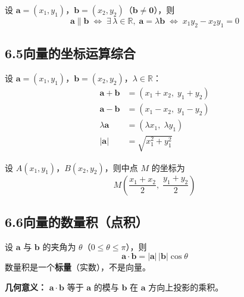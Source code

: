 \documentclass[12pt, a4paper]{ctexart}
\begin{document}
\begin{knowledgebox}[共线（平行）的充要条件]
设 $\boldsymbol{a}=(x_1,y_1)$，$\boldsymbol{b}=(x_2,y_2)$（$\boldsymbol{b}\neq\boldsymbol{0}$），则
\[
\boldsymbol{a}\parallel\boldsymbol{b} \;\Longleftrightarrow\; \exists\,\lambda\in\mathbb{R},\;\boldsymbol{a}=\lambda\boldsymbol{b}
\;\Longleftrightarrow\; x_1 y_2 - x_2 y_1 = 0
\]
\end{knowledgebox}

\subsection*{6.5\quad 向量的坐标运算综合}

\begin{knowledgebox}[坐标运算汇总]
设 $\boldsymbol{a}=(x_1,y_1)$，$\boldsymbol{b}=(x_2,y_2)$，$\lambda\in\mathbb{R}$：
\[
\begin{aligned}
  \boldsymbol{a}+\boldsymbol{b} &= (x_1+x_2,\; y_1+y_2) \\
  \boldsymbol{a}-\boldsymbol{b} &= (x_1-x_2,\; y_1-y_2) \\
  \lambda\boldsymbol{a} &= (\lambda x_1,\;\lambda y_1) \\
  |\boldsymbol{a}| &= \sqrt{x_1^2+y_1^2}
\end{aligned}
\]

设 $A(x_1,y_1)$，$B(x_2,y_2)$，则中点 $M$ 的坐标为
\[
M\!\left(\frac{x_1+x_2}{2},\;\frac{y_1+y_2}{2}\right)
\]
\end{knowledgebox}

\subsection*{6.6\quad 向量的数量积（点积）}

\begin{knowledgebox}[数量积的定义]
设 $\boldsymbol{a}$ 与 $\boldsymbol{b}$ 的夹角为 $\theta$（$0\leqslant\theta\leqslant\pi$），则
\[
\boldsymbol{a}\cdot\boldsymbol{b} = |\boldsymbol{a}|\,|\boldsymbol{b}|\cos\theta
\]
数量积是一个\textbf{标量}（实数），不是向量。

\textbf{几何意义：} $\boldsymbol{a}\cdot\boldsymbol{b}$ 等于 $\boldsymbol{a}$ 的模与 $\boldsymbol{b}$ 在 $\boldsymbol{a}$ 方向上投影的乘积。
\end{knowledgebox}
\end{document}
